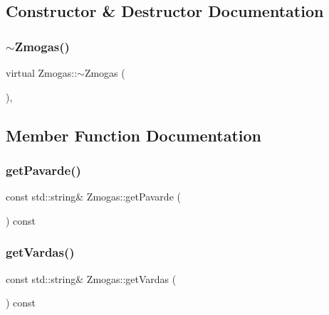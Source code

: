 \subsection{Constructor \& Destructor Documentation}
\mbox{\label{class_zmogas_ac2e2ca496b9478f7e87fc23450757ee6}} 
\subsubsection{\texorpdfstring{$\sim$Zmogas()}{~Zmogas()}}
{\footnotesize\ttfamily virtual Zmogas\+::$\sim$\+Zmogas (\begin{DoxyParamCaption}{ }\end{DoxyParamCaption})\hspace{0.3cm}{\ttfamily [inline]}, {\ttfamily [virtual]}}



\subsection{Member Function Documentation}
\mbox{\label{class_zmogas_a3839c9438bc70a25c82bed34e56366c2}} 
\subsubsection{\texorpdfstring{getPavarde()}{getPavarde()}}
{\footnotesize\ttfamily const std\+::string\& Zmogas\+::get\+Pavarde (\begin{DoxyParamCaption}{ }\end{DoxyParamCaption}) const\hspace{0.3cm}{\ttfamily [inline]}}

\mbox{\label{class_zmogas_a32e2c97902e645d6d5fcea6c6f45e1e7}} 
\subsubsection{\texorpdfstring{getVardas()}{getVardas()}}
{\footnotesize\ttfamily const std\+::string\& Zmogas\+::get\+Vardas (\begin{DoxyParamCaption}{ }\end{DoxyParamCaption}) const\hspace{0.3cm}{\ttfamily [inline]}}


